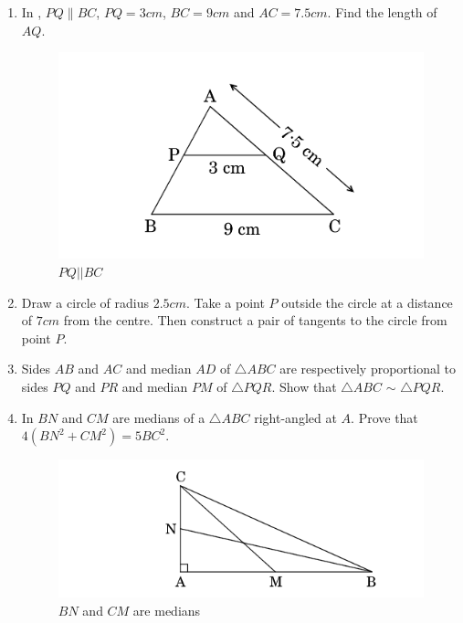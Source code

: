 \begin{enumerate}[label=\thesection.\arabic*.,ref=\thesection.\theenumi]
\begin{enumerate}[label=\arabic*.,ref=\theenumi]
    \item In , $PQ\parallel BC$, $PQ=3cm$, $BC=9cm$  and $AC=7.5cm$. Find the length of $AQ$.
    \begin{figure}[H]
        \centering
        \includegraphics[width=\columnwidth]{./figs/figure1.png}
        \caption{$PQ\left |  \right | BC$}
        \label{fig:fig1.png}
    \end{figure}

    \item Draw a circle of radius $2.5cm$. Take a point $P$ outside the circle at a distance of $7cm$ from the centre. Then construct a pair of tangents to the circle from point $P$.

    \item Sides $AB$ and $AC$ and median $AD$ of $\triangle ABC$ are respectively proportional to sides $PQ$ and $PR$ and median $PM$ of $\triangle PQR$. Show that $\triangle ABC$  $\sim$  $\triangle PQR$.

     \item In  $BN$ and $CM$ are medians of a  $\triangle ABC$ right-angled at $A$. Prove that $4 (BN^2 + CM^2) = 5 BC^2$.

    \begin{figure}[H]
        \centering
        \includegraphics[width=\columnwidth]{./figs/figure2.png}
        \caption{ $BN$ and $CM$ are medians}
        \label{fig:fig2.png}
    \end{figure}


\end{enumerate}
\end{enumerate}

